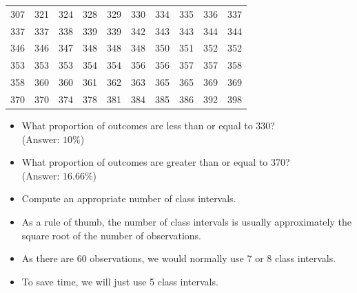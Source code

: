 \documentclass[12pt]{report}
\begin{document}
		\small
		\begin{center}
			\begin{tabular}{|c c c c c c c c c c|}
				\hline
				307 & 321 & 324 & 328 & 329 & 330 & 334 & 335 & 336 &337 \\
				337 & 337 & 338 & 339 & 339 & 342 & 343 & 343 & 344 &344 \\
				346 & 346 & 347 & 348 & 348 & 348 & 350 & 351 & 352 &352 \\
				353 & 353 & 353 & 354 & 354 & 356 & 356 & 357 & 357 &358 \\
				358 & 360 & 360 & 361 & 362 & 363 & 365 & 365 & 369 &369 \\
				370 & 370 & 374 & 378 & 381 & 384 & 385 & 386 & 392 &398 \\
				\hline
			\end{tabular}
		\end{center}
		\normalsize
		\begin{itemize}
			\item What proportion of outcomes are less than or equal to 330? \\ (Answer: $10\%$)
			\item What proportion of outcomes are greater than or equal to 370?\\ (Answer: $16.66\%$)
		\end{itemize}
		
		

		
		
		
		
		\begin{itemize}
			\item Compute an appropriate number of class intervals.
			\item As a rule of thumb, the number of class intervals is usually approximately the square root of the number of observations.
			\item As there are 60 observations, we would normally use 7 or 8 class intervals.
			\item To save time, we will just use 5 class intervals.
		\end{itemize}
		
		
		
		
\end{document}

